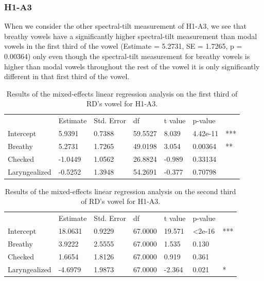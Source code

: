 \documentclass[12pt, letterpaper]{article}
\providecommand{\lsptoprule}{\midrule\toprule}
\providecommand{\lspbottomrule}{\bottomrule\midrule}
\begin{document}
\subsubsection{H1-A3}

When we consider the other spectral-tilt measurement of H1-A3, we see that breathy vowels have a significantly higher spectral-tilt measurement than modal vowels in the first third of the vowel (Estimate = 5.2731, SE = 1.7265, p = 0.00364) only even though the spectral-tilt measurement for breathy vowels is higher than modal vowels throughout the rest of the vowel it is only significantly different in that first third of the vowel. 

\begin{table}[!h]
    \centering
    \caption{Results of the mixed-effects linear regression analysis on the first third of RD's  vowel for H1-A3. }
    \label{tab:RD_H1A3_First}
    \begin{tabular}{lllllll}
	\lsptoprule
					&  Estimate  & Std. Error & df & t value & p-value & \\
        Intercept       &  5.9391 & 0.7388 & 59.5527 & 8.039 & 4.42e-11 & *** \\  
  	Breathy   		&  5.2731 & 1.7265 & 49.0198 & 3.054 & 0.00364 & **\\
	Checked    		& -1.0449 & 1.0562 & 26.8824 & -0.989 & 0.33134 & \\
	Laryngealized	& -0.5252 & 1.3948 & 54.2691 & -0.377 & 0.70798 & \\
        \lspbottomrule
    \end{tabular}
\end{table}

\begin{table}[!h]
    \centering
    \caption{Results of the mixed-effects linear regression analysis on the second third of RD's vowel for H1-A3. }
    \label{tab:RD_H1A3_Second}
    \begin{tabular}{lllllll}
	\lsptoprule
					&  Estimate  & Std. Error & df & t value & p-value & \\
        Intercept       & 18.0631 & 0.9229 & 67.0000 & 19.571 & <2e-16 & *** \\  
  	Breathy   		&  3.9222 & 2.5555 & 67.0000 &  1.535 & 0.130 & \\
	Checked    		&  1.6654 & 1.8126 & 67.0000 & 0.919 & 0.361 & \\
	Laryngealized	& -4.6979 & 1.9873 & 67.0000 & -2.364 & 0.021 & * \\
        \lspbottomrule
    \end{tabular}
\end{table}
\end{document}
